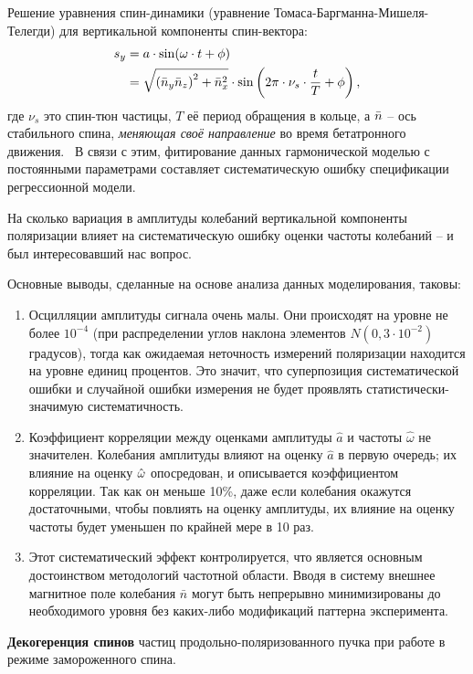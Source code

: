 Решение уравнения спин-динамики (уравнение Томаса-Баргманна-Мишеля-Телегди)
для вертикальной компоненты спин-вектора:
\begin{align}
s_y &= a\cdot \sin(\omega\cdot t + \phi)\notag\\
	  &= \sqrt{\bkt{\bar n_y\bar n_z}^2 + \bar n_x^2} \cdot \sin\bkt{2\pi\cdot\nu_s\cdot \frac{t}{T} + \phi},
\end{align}
где $\nu_s$ это спин-тюн частицы, $T$ её период обращения в кольце, а $\bar n$ -- ось стабильного спина, \emph{меняющая своё направление} во время бетатронного движения.~\cite[стр.~11]{Shatunov} В связи с этим, фитирование данных гармонической моделью с постоянными
параметрами составляет систематическую ошибку спецификации регрессионной модели.

На сколько вариация в амплитуды колебаний вертикальной
компоненты поляризации влияет на систематическую ошибку оценки частоты колебаний -- 
и был интересовавший нас вопрос.

Основные выводы, сделанные на основе анализа данных моделирования, таковы:
\begin{enumerate}
	\item Осцилляции амплитуды сигнала очень малы. Они происходят на уровне не более $10^{-4}$ (при
	распределении углов наклона элементов ${N(0, 3\cdot 10^{-2})}$ градусов), 
	тогда как ожидаемая неточность измерений поляризации находится 	на уровне единиц процентов. 
	Это значит, что суперпозиция систематической ошибки и случайной ошибки измерения
	не будет проявлять статистически-значимую систематичность.
	\item Коэффициент корреляции между оценками амплитуды $\hat a$ и частоты $\hat\omega$ не значителен. Колебания амплитуды
	влияют на оценку $\hat a$ в первую очередь; их влияние на оценку $\hat{\omega}$ опосредован, и описывается
	коэффициентом корреляции. Так как он меньше 10\%, даже если колебания окажутся достаточными, 
	чтобы повлиять на оценку амплитуды, их влияние на оценку частоты будет уменьшен по крайней мере в 10 раз.
	\item Этот систематический эффект контролируется, что является основным достоинством методологий
	частотной области. Вводя в систему внешнее магнитное поле	колебания $\bar n$ могут быть 
	непрерывно минимизированы  до необходимого уровня без каких-либо модификаций паттерна эксперимента.
\end{enumerate}

\textbf{Декогеренция спинов} частиц продольно-поляризованного пучка 
при работе в режиме замороженного спина.

